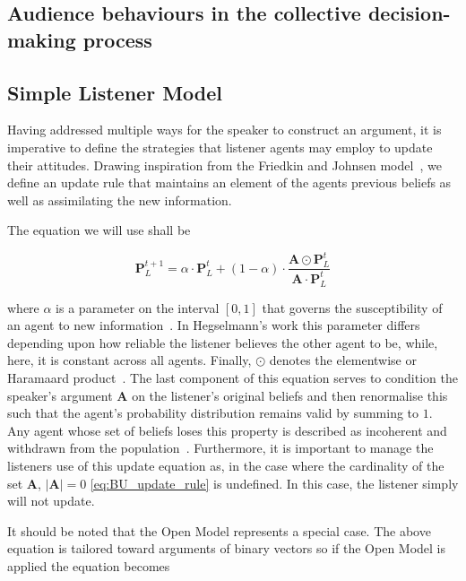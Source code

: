 \subsection{Audience behaviours in the collective decision-making process} \label{sect:listener_models}

\subsection*{Simple Listener Model}
Having addressed multiple ways for the speaker to construct an argument, it is imperative to define the strategies that listener agents may employ to update their attitudes. Drawing inspiration from the Friedkin and Johnsen model~\cite{Friedkin1999SocialChange}, we define an update rule that maintains an element of the agents previous beliefs as well as assimilating the new information. 

The equation we will use shall be


\begin{equation} \label{eq:BU_update_rule}
    \mathbf{P}^{t+1}_L = \alpha \cdot \mathbf{P}^{t}_L + (1 - \alpha) \cdot  \frac{\mathbf{A} \odot \mathbf{P}^t_L}{\mathbf{A} \cdot \mathbf{P}^t_L}
\end{equation}

where $\alpha$ is a parameter on the interval $[0, 1]$ that governs the susceptibility of an agent to new information~\cite{Hegselmann2002Opinion}. In Hegselmann's work this parameter differs depending upon how reliable the listener believes the other agent to be, while, here, it is constant across all agents. Finally, $\odot$ denotes the elementwise or Haramaard product~\cite{Johnson1990MatrixApplications}. The last component of this equation serves to condition the speaker's argument $\mathbf{A}$  on the listener's original beliefs and then renormalise this such that the agent's probability distribution remains valid by summing to $1$. Any agent whose set of beliefs loses this property is described as incoherent and withdrawn from the population~\cite{Lee2018CombiningConsensus}. Furthermore, it is important to manage the listeners use of this update equation as, in the case where the cardinality of the set $\mathbf{A}$, $|\mathbf{A}| = 0$ \cref{eq:BU_update_rule} is undefined. In this case, the listener simply will not update.  

It should be noted that the Open Model represents a special case. The above equation is tailored toward arguments of binary vectors so if the Open Model is applied the equation becomes 

